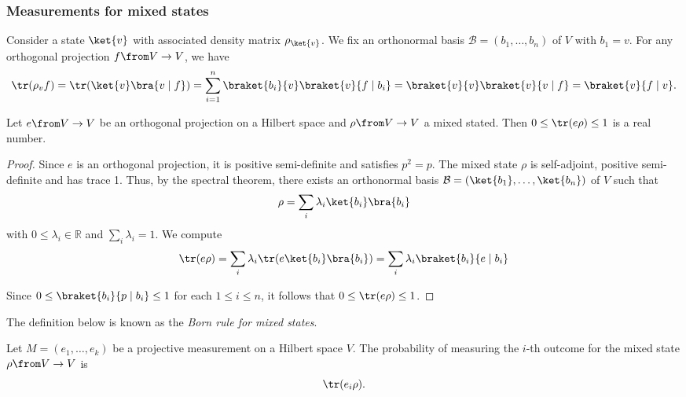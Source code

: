\documentclass[a4paper,oneside, 12pt]{amsart}
\begin{document}
\subsubsection{Measurements for mixed states}\label{sec:measurements-for-mixed-states}
Consider a state \(\ket{v}\) with associated density matrix \(\rho_{\ket{v}}\).
We fix an orthonormal basis \( \mathcal{B}= (b_{1}, \dots , b_{n})\) of \(V\) with \(b_{1} = v\).
For any orthogonal projection \(f \from V \to V\), we have
\begin{equation*}
  \tr(\rho_{v} f)
  = \tr(\ket{v} \bra{v\mid f})
  =\sum_{i=1}^n \braket{b_i}{v} \braket{v}{ f \mid b_i}
  = \braket{v}{v} \braket{v}{v\mid f}
  = \braket{v}{f \mid v}.
\end{equation*}

\begin{lemma}\label{lem:get-prob-values}
  Let \(e\from V\to V\) be an orthogonal projection on a Hilbert space and \(\rho \from V \to V\) a mixed stated.
  Then \(0\leq \tr(e\rho) \leq 1\) is a real number.
\end{lemma}
\begin{proof}
  Since \( e \) is an orthogonal projection, it is positive semi-definite and satisfies \( p^2 = p \).
  The mixed state \( \rho \) is self-adjoint, positive semi-definite and has trace 1.
  Thus, by the spectral theorem, there exists an orthonormal basis \(\mathcal{B}= (\ket{b_{1}}, \dots , \ket{b_{n}})\) of \(V\) such that
  \begin{equation*}
    \rho = \sum_i \lambda_i \ket{b_{i}} \bra{b_{i}}
  \end{equation*}
  with  \( 0 \leq \lambda_i  \in \mathbb{R}\) and \( \sum_i \lambda_i = 1 \).
  We compute
  \begin{equation*}
    \tr(e\rho)
    = \sum_i \lambda_i \tr(e \ket{b_i} \bra{b_i}) =
    \sum_i \lambda_i \braket{b_i}{e \mid b_i}
  \end{equation*}

  Since \( 0 \leq \braket{b_i}{p \mid b_i} \leq 1 \) for each \( 1\leq i \leq n \), it follows that \( 0 \leq \tr(e\rho) \leq 1 \).
\end{proof}

The definition below is known as the \emph{Born rule for mixed states}.
\begin{definition}\label{def:Born-rule-for-projective-measurment}
  Let \(M= (e_{1}, \dots , e_{k})\) be a projective measurement on a Hilbert space \(V\).
  The  probability of measuring the \(i\)-th outcome for the mixed state \(\rho \from V\to V\) is
  \begin{equation*}
    \tr(e_{i}\rho).
  \end{equation*}
\end{definition}
\end{document}
